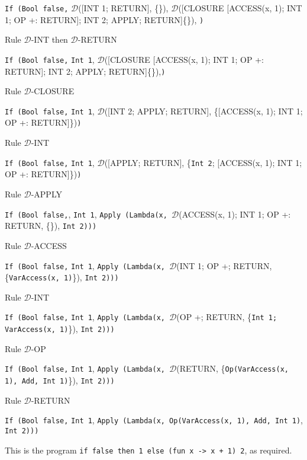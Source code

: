 \documentclass[11pt]{article}
\begin{document}
\begin{landscape}
{\noindent \texttt{If (Bool false,} $\mathcal{D}$([INT 1; RETURN], \{\}), $\mathcal{D}$([CLOSURE [ACCESS(x, 1); INT 1; OP +: RETURN]; INT 2; APPLY; RETURN]\{\}), \texttt{)}

\smallskip
\noindent Rule $\mathcal{D}$-INT then $\mathcal{D}$-RETURN
\smallskip


\noindent \texttt{If (Bool false,} \texttt{Int 1}, $\mathcal{D}$([CLOSURE [ACCESS(x, 1); INT 1; OP +: RETURN]; INT 2; APPLY; RETURN]\{\}),\texttt{)}

\smallskip
\noindent Rule $\mathcal{D}$-CLOSURE
\smallskip


\noindent \texttt{If (Bool false,} \texttt{Int 1}, $\mathcal{D}$([INT 2; APPLY; RETURN], \{[ACCESS(x, 1); INT 1; OP +: RETURN]\})\texttt{)}

\smallskip
\noindent Rule $\mathcal{D}$-INT
\smallskip

\noindent \texttt{If (Bool false,} \texttt{Int 1}, $\mathcal{D}$([APPLY; RETURN], \{\texttt{Int 2}; [ACCESS(x, 1); INT 1; OP +: RETURN]\})\texttt{)}

\smallskip
\noindent Rule $\mathcal{D}$-APPLY
\smallskip

\noindent \texttt{If (Bool false,}, \texttt{Int 1}, \texttt{Apply (Lambda(x, }$\mathcal{D}$(ACCESS(x, 1); INT 1; OP +: RETURN, \{\}), \texttt{Int 2))}\texttt{)}

\smallskip
\noindent Rule $\mathcal{D}$-ACCESS
\smallskip

\noindent \texttt{If (Bool false,} \texttt{Int 1}, \texttt{Apply (Lambda(x, }$\mathcal{D}$(INT 1; OP +; RETURN, \{\texttt{VarAccess(x, 1)}\}), \texttt{Int 2))}\texttt{)}

\smallskip
\noindent Rule $\mathcal{D}$-INT
\smallskip

\noindent \texttt{If (Bool false,} \texttt{Int 1}, \texttt{Apply (Lambda(x, }$\mathcal{D}$(OP +; RETURN, \{\texttt{Int 1; VarAccess(x, 1)}\}), \texttt{Int 2))}\texttt{)}

\smallskip
\noindent Rule $\mathcal{D}$-OP
\smallskip

\noindent \texttt{If (Bool false,} \texttt{Int 1}, \texttt{Apply (Lambda(x, }$\mathcal{D}$(RETURN, \{\texttt{Op(VarAccess(x, 1), Add, Int 1)}\}), \texttt{Int 2))}\texttt{)}

\smallskip
\noindent Rule $\mathcal{D}$-RETURN
\smallskip

\noindent \texttt{If (Bool false,} \texttt{Int 1}, \texttt{Apply (Lambda(x, Op(VarAccess(x, 1), Add, Int 1)}, \texttt{Int 2))}\texttt{)}

\bigskip

\noindent This is the program \texttt{if false then 1 else (fun x -> x + 1) 2}, as required.

}\end{landscape}
\end{document}
